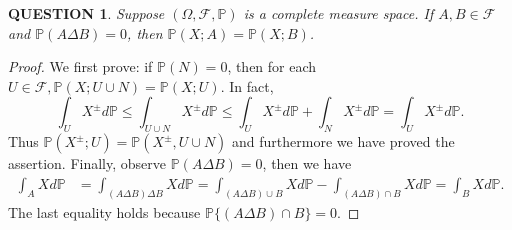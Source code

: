 \documentclass[12pt]{article}
\renewcommand{\(}{\left(}%
\renewcommand{\)}{\right)}%
\renewcommand{\[}{\left[}%
\renewcommand{\]}{\right]}%
\newcommand{\p}{\mathbb{P}}
\newcommand{\f}{\mathscr{F}}
\newtheorem{question}{QUESTION}[section]}
\newtheorem{proof}{Proof.}}
\begin{document}
  \begin{question}
   Suppose $(\Omega,\f,\p )$ is a complete measure space. If $A,B\in\f$ and $\p(A\Delta B)=0$, then $\p(X;A)=\p(X;B)$.
  \end{question}
  \begin{proof}
   We first prove: if $\p(N)=0$, then for each $U\in\f,\p(X;U\cup N)=\p(X;U)$. In fact,
   \begin{equation*}
    \int_UX^\pm d\p \leq \int_{U\cup N}X^\pm d\p\leq \int_UX^\pm d\p+\int_NX^\pm d\p=\int_UX^\pm d\p.
   \end{equation*}
   Thus $\p(X^\pm;U)=\p(X^\pm,U\cup N)$ and furthermore we have proved the assertion. Finally, observe $\p(A\Delta B)=0$, then we have
   \begin{equation*}
    \begin{split}
     \int_{A}Xd\p&=\int_{(A\Delta B)\Delta B}Xd\p=\int_{(A\Delta B)\cup B}Xd\p-\int_{(A\Delta B)\cap B}Xd\p=\int_BX d\p.
    \end{split}
   \end{equation*}
   The last equality holds because $\p\{(A\Delta B)\cap B \}=0$.
  \end{proof}
\end{document}
